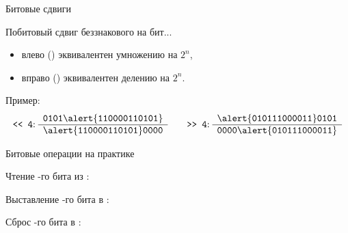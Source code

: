 \begin{frame}{Битовые сдвиги}

  Побитовый сдвиг беззнакового  на  бит...
  \begin{itemize}
    \item влево () эквивалентен умножению на $2^n$,
    \item вправо () эквивалентен делению на $2^n$.
  \end{itemize}

  \begin{block}{Пример:}
    \reduceBlockEqSpacing
    \begin{equation*}
      \text{\code{<{}< 4}:}\thickspace
      \begin{array}{r}
        \pcnum{0101 \alert{1100 0011 0101}} \\
        \hline
        \pcnum{\alert{1100 0011 0101} 0000} \\
      \end{array}
      \qquad
      \text{\code{>{}> 4}:}\thickspace
      \begin{array}{r}
        \pcnum{\alert{0101 1100 0011} 0101} \\
        \hline
        \pcnum{0000 \alert{0101 1100 0011}} \\
      \end{array}
    \end{equation*}
  \end{block}

\end{frame}

\begin{frame}{Битовые операции на практике}

  \begin{block}{Чтение -го бита из :}
  \end{block}

  \begin{block}{Выставление -го бита в :}
  \end{block}

  \begin{block}{Сброс -го бита в :}
  \end{block}

\end{frame}

